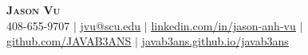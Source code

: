 \begin{center}
    \textbf{\Huge \scshape Jason Vu} \\ \vspace{1pt}
    \small 408-655-9707 $|$ \href{mailto:jvu@scu.edu}{\underline{jvu@scu.edu}} $|$ 
    \href{https://linkedin.com/in/jason-anh-vu}{\underline{linkedin.com/in/jason-anh-vu}} $|$
    \href{https://github.com/javab3ans}{\underline{github.com/JAVAB3ANS}} $|$
    \href{https://javab3ans.github.io/javab3ans}{\underline{javab3ans.github.io/javab3ans}}
\end{center} 